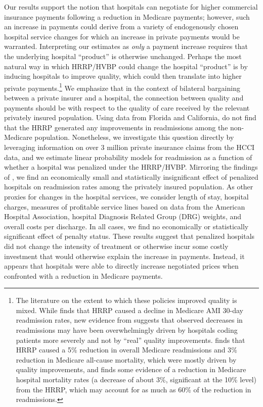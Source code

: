 \documentclass[12pt]{article}
\begin{document}
Our results support the notion that hospitals can negotiate for higher commercial insurance payments following a reduction in Medicare payments; however, such an increase in payments could derive from a variety of endogenously chosen hospital service changes for which an increase in private payments would be warranted. Interpreting our estimates as \textit{only} a payment increase requires that the underlying hospital ``product'' is otherwise unchanged. Perhaps the most natural way in which HRRP/HVBP could change the hospital ``product'' is by inducing hospitals to improve quality, which could then translate into higher private payments.\footnote{The literature on the extent to which these policies improved quality is mixed. While \citet{mellor2016} finds that HRRP caused a decline in Medicare AMI 30-day readmission rates, new evidence from \citet{Ibrahim2017} suggests that observed decreases in readmissions may have been overwhelmingly driven by hospitals coding patients more severely and not by ``real'' quality improvements.  \cite{gupta2017} finds that HRRP caused a 5$\%$ reduction in overall Medicare readmissions and 3$\%$ reduction in Medicare all-cause mortality, which were mostly driven by quality improvements, and \cite{gupta2016} finds some evidence of a reduction in Medicare hospital mortality rates (a decrease of about 3\%, significant at the 10\% level) from the HRRP, which may account for as much as 60\% of the reduction in readmissions.} We emphasize that in the context of bilateral bargaining between a private insurer and a hospital, the connection between quality and payments should be with respect to the quality of care received by the relevant privately insured population. Using data from Florida and California, \cite{demiralp2017} do not find that the HRRP generated any improvements in readmissions among the non-Medicare population.  Nonetheless, we investigate this question directly by leveraging information on over 3 million private insurance claims from the HCCI data, and we estimate linear probability models for readmission as a function of whether a hospital was penalized under the HRRP/HVBP. Mirroring the findings of \cite{demiralp2017}, we find an economically small and statistically insignificant effect of penalized hospitals on readmission rates among the privately insured population.  As other proxies for changes in the hospital services, we consider length of stay, hospital charges, measures of profitable service lines based on data from the American Hospital Association, hospital Diagnosis Related Group (DRG) weights, and overall costs per discharge. In all cases, we find no economically or statistically significant effect of penalty status. These results suggest that penalized hospitals did not change the intensity of treatment or otherwise incur some costly investment that would otherwise explain the increase in payments. Instead, it appears that hospitals were able to directly increase negotiated prices when confronted with a reduction in Medicare payments.
\end{document}
